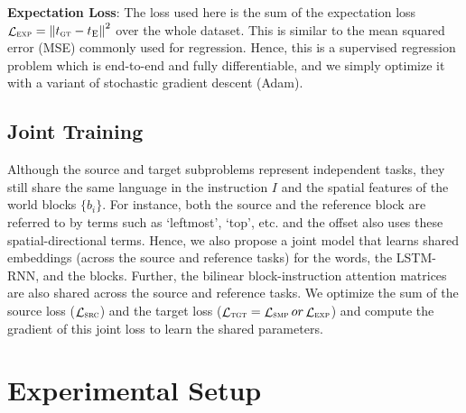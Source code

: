 \documentclass[letterpaper]{article} %
\DeclareMathOperator{\loss}{\mathcal{L}}
\begin{document}
\textbf{Expectation Loss}:
The loss used here is the sum of the expectation loss $\loss_\textsc{exp} = \left \Vert t_\textsc{gt} - t_\textsc{E} \right \Vert^2$ over the whole dataset. This is similar to the mean squared error (MSE) commonly used for regression. Hence, this is a supervised regression problem which is end-to-end and fully differentiable, and we simply optimize it with a variant of stochastic gradient descent (Adam).


\subsection{Joint Training}
\label{sec:joint}
Although the source and target subproblems represent independent tasks, they still share the same language in the instruction $I$ and the spatial features of the world blocks $\{b_i\}$. For instance, both the source and the reference block are referred to by terms such as `leftmost', `top', etc. and the offset also uses these spatial-directional terms. Hence, we also propose a joint model that learns shared embeddings (across the source and reference tasks) for the words, the LSTM-RNN, and the blocks. Further, the bilinear block-instruction attention matrices are also shared across the source and reference tasks. We optimize the sum of the source loss ($\loss_\textsc{src}$) and the target loss ($\loss_\textsc{tgt} = \loss_\textsc{smp} or \loss_\textsc{exp}$) and compute the gradient of this joint loss to learn the shared parameters.

\section{Experimental Setup}
\end{document}
